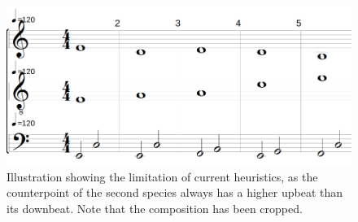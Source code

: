\begin{figure}[h]
  \centering
  \includegraphics[width=.6\textwidth]{Images/limitation-with-lowest-array.png}
  \caption{Illustration showing the limitation of current heuristics, as the counterpoint of the second species always has a higher upbeat than its downbeat. Note that the composition has been cropped.}
  \label{fig:limitation-lowest-array}
\end{figure}




